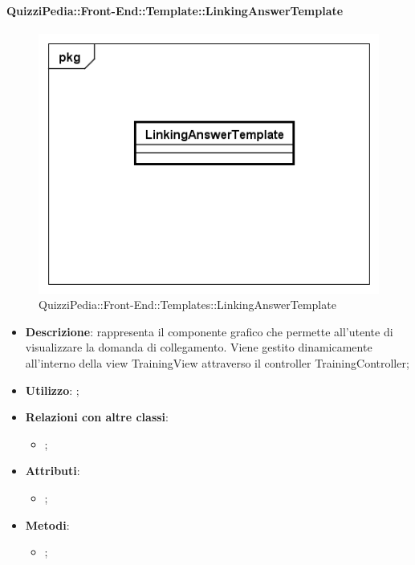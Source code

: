 		\paragraph{QuizziPedia::Front-End::Template::LinkingAnswerTemplate}
		
		\label{QuizziPedia::Front-End::Templates::LinkingAnswerTemplate}
		
		\begin{figure}[h]
			\centering
			\includegraphics[scale=0.5,keepaspectratio]{UML/Classi/Front-End/QuizziPedia_Front-end_Templates_LinkingAnswerTemplate.png}
			\caption{QuizziPedia::Front-End::Templates::LinkingAnswerTemplate}
		\end{figure}		
		
		\begin{itemize}
			\item \textbf{Descrizione}: rappresenta il componente grafico che permette all'utente di visualizzare la domanda di collegamento. Viene gestito dinamicamente all'interno della view TrainingView attraverso il controller TrainingController;
			\item \textbf{Utilizzo}: ;
			\item \textbf{Relazioni con altre classi}: 
			\begin{itemize}
				\item ;
			\end{itemize}
			\item \textbf{Attributi}: 
			\begin{itemize}
				\item ;
			\end{itemize}
			\item \textbf{Metodi}: 
			\begin{itemize}
				\item ;
			\end{itemize}
		\end{itemize}
		
